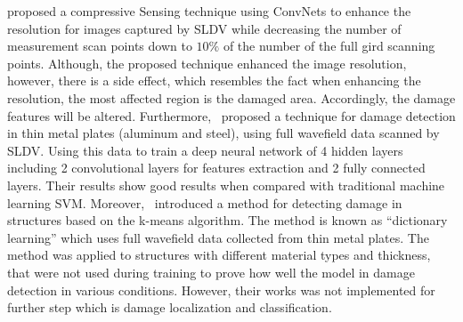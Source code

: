 \textcite{esfandabadideep} proposed a compressive Sensing technique using ConvNets to enhance the resolution for images captured by SLDV while decreasing the number of measurement scan points down to \(10\%\) of the number of the full gird scanning points. 
Although, the proposed technique enhanced the image resolution, however, there is a side effect, which resembles the fact when enhancing the resolution, the most affected region is the damaged area. 
Accordingly, the damage features will be altered.
Furthermore,~\textcite{Melville2018} proposed a technique for damage detection in thin metal plates (aluminum and steel), using full wavefield data scanned by SLDV. 
Using this data to train a deep neural network of 4 hidden layers including 2 convolutional layers for features extraction and 2 fully connected layers. Their results show good results when compared with traditional machine learning SVM.
Moreover,~\textcite{Melville2017} introduced a method for detecting damage in structures based on the k-means algorithm. 
The method is known as \enquote{dictionary learning} which uses full wavefield data collected from thin metal plates. 
The method was applied to structures with different material types and thickness, that were not used during training to prove how well the model in damage detection in various conditions. 
However, their works was not implemented for further step which is damage localization and classification.
